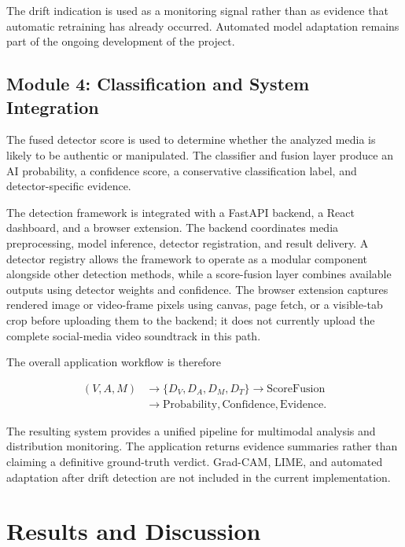 \documentclass[conference]{IEEEtran}
\begin{document}
The drift indication is used as a monitoring signal rather than as evidence that automatic retraining has already occurred. Automated model adaptation remains part of the ongoing development of the project.

\subsection{Module 4: Classification and System Integration}

The fused detector score is used to determine whether the analyzed media is likely to be authentic or manipulated. The classifier and fusion layer produce an AI probability, a confidence score, a conservative classification label, and detector-specific evidence.

The detection framework is integrated with a FastAPI backend, a React dashboard, and a browser extension. The backend coordinates media preprocessing, model inference, detector registration, and result delivery. A detector registry allows the framework to operate as a modular component alongside other detection methods, while a score-fusion layer combines available outputs using detector weights and confidence. The browser extension captures rendered image or video-frame pixels using canvas, page fetch, or a visible-tab crop before uploading them to the backend; it does not currently upload the complete social-media video soundtrack in this path.

The overall application workflow is therefore

\begin{equation}
\begin{aligned}
(V,A,M)
&\rightarrow \{D_V,D_A,D_M,D_T\}
\rightarrow \mathrm{ScoreFusion}\\
&\rightarrow \mathrm{Probability,Confidence,Evidence}.
\end{aligned}
\end{equation}

The resulting system provides a unified pipeline for multimodal analysis and distribution monitoring. The application returns evidence summaries rather than claiming a definitive ground-truth verdict. Grad-CAM, LIME, and automated adaptation after drift detection are not included in the current implementation.

\section{Results and Discussion}
\end{document}
